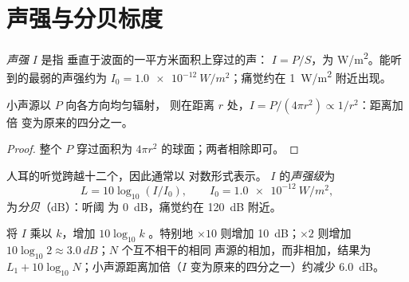 \section{声强与分贝标度}

\begin{definition}[声强]\label{def:g12:sound-acoustics:intensity}
\emph{声强} $I$ 是指
垂直于波面的一平方米面积上穿过的声：
$I = P/S$，为 \unit{W/m^2}。能听到的最弱的声强约为
$I_0 = \qty{1.0e-12}{W/m^2}$；痛觉约在 \qty{1}{W/m^2} 附近出现。
\end{definition}

\begin{proposition}[平方反比衰减]\label{prop:g12:sound-acoustics:inverse-square}
%
小声源以 $P$ 向各方向均匀辐射，
则在距离 $r$ 处，$I = P/(4\pi r^2) \propto 1/r^2$：距离加倍
变为原来的四分之一。
\end{proposition}

\begin{proof}
整个 $P$ 穿过面积为 $4\pi r^2$ 的球面；两者相除即可。
\end{proof}

\begin{definition}[声强级]\label{def:g12:sound-acoustics:level}
人耳的听觉跨越十二个，因此通常以
对数形式表示。 $I$ 的\emph{声强级}为
\[ L = 10 \log_{10}(I/I_0), \qquad I_0 = \qty{1.0e-12}{W/m^2}, \]
为\emph{分贝}（\unit{dB}）：听阈
为 \qty{0}{dB}，痛觉约在 \qty{120}{dB} 附近。
\end{definition}

\begin{proposition}[分贝运算]\label{prop:g12:sound-acoustics:db-arithmetic}
将 $I$ 乘以 $k$，增加 $10\log_{10}k$ 。特别地
$\times 10$ 则增加 \qty{10}{dB}；$\times 2$ 则增加
$10\log_{10}2 \approx \qty{3.0}{dB}$；$N$ 个互不相干的相同
声源的\emph{}相加，而非相加，结果为
$L_1 + 10\log_{10}N$；小声源距离加倍（$I$
变为原来的四分之一）约减少 \qty{6.0}{dB}。
\end{proposition}

